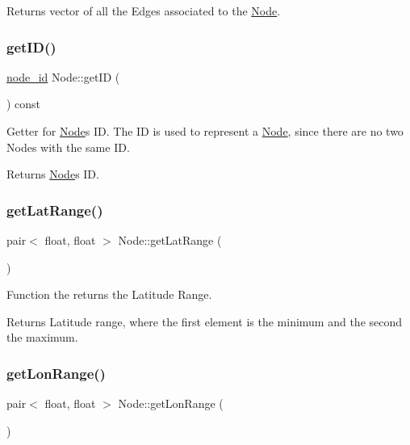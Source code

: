 \begin{DoxyReturn}{Returns}
vector of all the Edges associated to the \hyperlink{class_node}{Node}. 
\end{DoxyReturn}
\hypertarget{class_node_a5e319f5c050c46590bed81fc4dc54325}{}\label{class_node_a5e319f5c050c46590bed81fc4dc54325} 
\subsubsection{\texorpdfstring{get\+I\+D()}{getID()}}
{\footnotesize\ttfamily \hyperlink{_node_8hpp_a9d6265804805c2375068fd7484840dc6}{node\+\_\+id} Node\+::get\+ID (\begin{DoxyParamCaption}{ }\end{DoxyParamCaption}) const}

Getter for \hyperlink{class_node}{Node}\textquotesingle{}s ID. The ID is used to represent a \hyperlink{class_node}{Node}, since there are no two Nodes with the same ID.

\begin{DoxyReturn}{Returns}
\hyperlink{class_node}{Node}\textquotesingle{}s ID. 
\end{DoxyReturn}
\hypertarget{class_node_a258af43995af26e3ce9401bdd4948b30}{}\label{class_node_a258af43995af26e3ce9401bdd4948b30} 
\subsubsection{\texorpdfstring{get\+Lat\+Range()}{getLatRange()}}
{\footnotesize\ttfamily pair$<$ float, float $>$ Node\+::get\+Lat\+Range (\begin{DoxyParamCaption}{ }\end{DoxyParamCaption})\hspace{0.3cm}{\ttfamily [static]}}

Function the returns the Latitude Range.

\begin{DoxyReturn}{Returns}
Latitude range, where the first element is the minimum and the second the maximum. 
\end{DoxyReturn}
\hypertarget{class_node_a8533c4ac90cb7bc99895546b161e7d5a}{}\label{class_node_a8533c4ac90cb7bc99895546b161e7d5a} 
\subsubsection{\texorpdfstring{get\+Lon\+Range()}{getLonRange()}}
{\footnotesize\ttfamily pair$<$ float, float $>$ Node\+::get\+Lon\+Range (\begin{DoxyParamCaption}{ }\end{DoxyParamCaption})\hspace{0.3cm}{\ttfamily [static]}}

